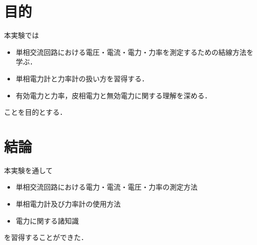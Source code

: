 \documentclass[11pt,dvipdfmx]{ujarticle}
\begin{document}
\begin{jikkenTitle}
 \end{jikkenTitle}

\section{目的}
本実験では
\begin{itemize}
	\item 単相交流回路における電圧・電流・電力・力率を測定するための結線方法を学ぶ．
	\item 単相電力計と力率計の扱い方を習得する．
	\item 有効電力と力率，皮相電力と無効電力に関する理解を深める．
\end{itemize}
ことを目的とする．






\section{結論}
本実験を通して
\begin{itemize}
	\item 単相交流回路における電力・電流・電圧・力率の測定方法
	\item 単相電力計及び力率計の使用方法
	\item 電力に関する諸知識
\end{itemize}
を習得することができた．

\newpage
\printbibliography[title=参考文献]
\end{document}
